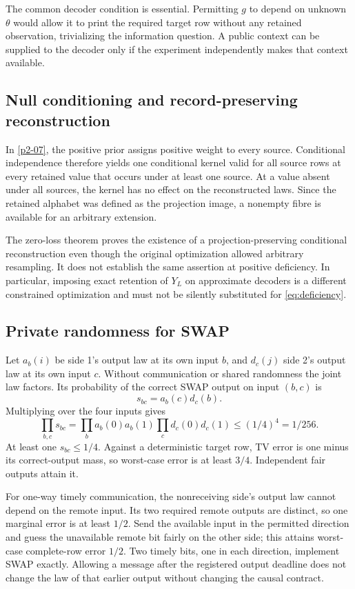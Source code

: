 The common decoder condition is essential. Permitting \(g\) to depend on unknown \(\theta\) would allow it to print the required target row without any retained observation, trivializing the information question. A public context can be supplied to the decoder only if the experiment independently makes that context available.

\subsection{Null conditioning and record-preserving reconstruction}
In \cref{p2-07}, the positive prior assigns positive weight to every source. Conditional independence therefore yields one conditional kernel valid for all source rows at every retained value that occurs under at least one source. At a value absent under all sources, the kernel has no effect on the reconstructed laws. Since the retained alphabet was defined as the projection image, a nonempty fibre is available for an arbitrary extension.

The zero-loss theorem proves the existence of a projection-preserving conditional reconstruction even though the original optimization allowed arbitrary resampling. It does not establish the same assertion at positive deficiency. In particular, imposing exact retention of \(Y_L\) on approximate decoders is a different constrained optimization and must not be silently substituted for \cref{eq:deficiency}.

\subsection{Private randomness for SWAP}
Let \(a_b(i)\) be side 1's output law at its own input \(b\), and \(d_c(j)\) side 2's output law at its own input \(c\). Without communication or shared randomness the joint law factors. Its probability of the correct SWAP output on input \((b,c)\) is
\[
 s_{bc}=a_b(c)d_c(b).
\]
Multiplying over the four inputs gives
\[
 \prod_{b,c}s_{bc}
 =\prod_b a_b(0)a_b(1)\prod_c d_c(0)d_c(1)
 \le(1/4)^4=1/256.
\]
At least one \(s_{bc}\le1/4\). Against a deterministic target row, TV error is one minus its correct-output mass, so worst-case error is at least \(3/4\). Independent fair outputs attain it.

For one-way timely communication, the nonreceiving side's output law cannot depend on the remote input. Its two required remote outputs are distinct, so one marginal error is at least \(1/2\). Send the available input in the permitted direction and guess the unavailable remote bit fairly on the other side; this attains worst-case complete-row error \(1/2\). Two timely bits, one in each direction, implement SWAP exactly. Allowing a message after the registered output deadline does not change the law of that earlier output without changing the causal contract.


